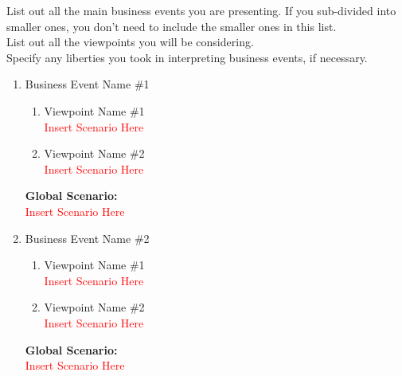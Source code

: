 \documentclass[]{article}
\begin{document}
 List out all the main business events you are presenting. If you sub-divided into smaller ones, you don't need to include the smaller ones in this list.\\

 List out all the viewpoints you will be considering.\\

 Specify any liberties you took in interpreting business events, if necessary.\\

\begin{enumerate}[{\bf BE1.}]
	\item Business Event Name \#1
		\begin{enumerate}[{\bf VP1.}]
			\item Viewpoint Name \#1 \\
				\textcolor{red}{Insert Scenario Here}
			\item Viewpoint Name \#2 \\
				\textcolor{red}{Insert Scenario Here}
		\end{enumerate}
		{\bf Global Scenario:}\\
		\textcolor{red}{Insert Scenario Here}
	\item Business Event Name \#2
	\begin{enumerate}[{\bf VP1.}]
		\item Viewpoint Name \#1 \\
		\textcolor{red}{Insert Scenario Here}
		\item Viewpoint Name \#2 \\
		\textcolor{red}{Insert Scenario Here}
	\end{enumerate}
	{\bf Global Scenario:}\\
	\textcolor{red}{Insert Scenario Here}
\end{enumerate}
\end{document}
